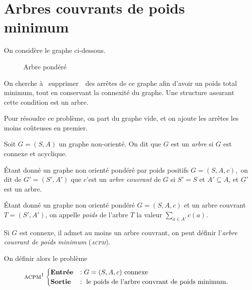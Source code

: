 \section{Arbres couvrants de poids minimum}

\begin{exm}
	On considère le graphe ci-dessous.
	\begin{figure}[H]
		\centering
		\caption{Arbre pondéré}
	\end{figure}
	On cherche à \guillemotleft~supprimer~\guillemotright\ des arrêtes de ce graphe afin d'avoir un poids total minimum, tout en conservant la connexité du graphe.
	Une structure assurant cette condition est un arbre.

	Pour résoudre ce problème, on part du graphe vide, et on ajoute les arrêtes les moins coûteuses en premier.
\end{exm}

\begin{defn}[Arbre]
	Soit $G = (S,A)$\/ un graphe non-orienté. On dit que $G$\/ est un \textit{arbre} si $G$\/ est connexe et acyclique.
\end{defn}

\begin{defn}
	Étant donné un graphe non orienté pondéré par poids positifs $G = (S, A, c)$,\footnotemark\ on dit de $G' = (S', A')$\/ que c'est un \textit{arbre couvrant} de $G$\/ si $S' = S$\/ et $A' \subseteq A$, et $G'$\/ est un arbre.
\end{defn}

\begin{defn}
	Étant donné un graphe non orienté pondéré $G = (S, A, c)$\/ et un arbre couvrant $T = (S', A')$, on appelle \textit{poids} de l'arbre $T$\/ la valeur $\sum_{a \in A'} c(a)$.

	Si $G$\/ est connexe, il admet au moins un arbre couvrant, on peut définir l'\textit{arbre couvrant de poids minimum} (\textit{\textsc{acpm}}).
\end{defn}

On définir alors le problème \[
	\textsc{acpm}\text{\footnotemark}
	\begin{cases}
		\text{\textbf{Entrée}}&: G = (S, A, c) \text{ connexe}\\
		\text{\textbf{Sortie}}&: \text{ le poids de l'arbre couvrant de poids minimum}.
	\end{cases}
\]

